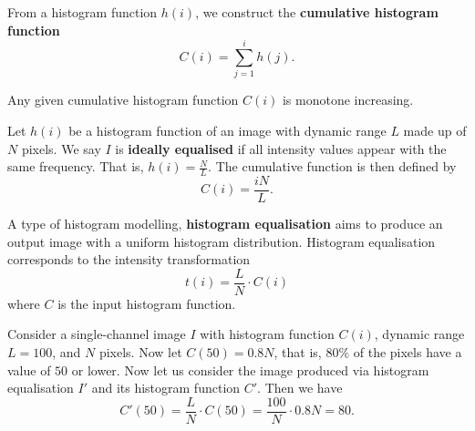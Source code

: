 \begin{definition}
    From a histogram function $h(i)$, we construct the \textbf{cumulative histogram function}
    \[ C(i) = \sum_{j = 1}^i h(j). \]
\end{definition}

\begin{proposition}[]
    Any given cumulative histogram function $C(i)$ is monotone increasing. 
\end{proposition}

\begin{definition}
    Let $h(i)$ be a histogram function of an image with dynamic range $L$ made up of $N$ pixels. We say $I$ is \textbf{ideally equalised} if all intensity values appear with the same frequency. That is, $h(i) = \frac{N}{L}$. The cumulative function is then defined by
    \[ C(i) = \frac{iN}L. \]
\end{definition}

\begin{definition}
    A type of histogram modelling, \textbf{histogram equalisation} aims to produce an output image with a uniform histogram distribution. Histogram equalisation corresponds to the intensity transformation
    \[ t(i) = \frac LN \cdot C(i) \]
    where $C$ is the input histogram function. 
\end{definition}

\begin{example}
    Consider a single-channel image $I$ with histogram function $C(i)$, dynamic range $L = 100$, and $N$ pixels. Now let $C(50) = 0.8N$, that is, 80\% of the pixels have a value of $50$ or lower. Now let us consider the image produced via histogram equalisation $I'$ and its histogram function $C'$. Then we have
    \[ C'(50) = \frac LN \cdot C(50) = \frac {100}N \cdot 0.8N = 80. \]
\end{example}
